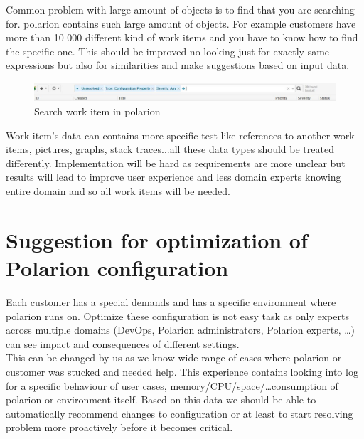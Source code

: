 \documentclass[thesis=M,english]{FITthesis}[2012/06/26]
\begin{document}
Common problem with large amount of objects is to find that you are searching for. \acrshort{polarion} contains such large amount of objects. For example customers have more than 10 000 different kind of work items and you have to know how to find the specific one. This should be improved no looking just for exactly same expressions but also for similarities and make suggestions based on input data. 

\begin{figure}[h!]\centering
	\includegraphics[width=1\textwidth]{pictures/polarion_search}
	\caption{Search work item in \acrshort{polarion}}\label{fig:polarion_search}
\end{figure}

Work item's data can contains more specific test like references to another work items, pictures, graphs, stack traces...all these data types should be treated differently. Implementation will be hard as requirements are more unclear but results will lead to improve user experience and less domain experts knowing entire domain and so all work items will be needed.

\section{Suggestion for optimization of Polarion configuration} 

Each customer has a special demands and has a specific environment where \acrshort{polarion} runs on. Optimize these configuration is not easy task as only experts across multiple domains (DevOps, Polarion administrators, Polarion experts, \dots) can see impact and consequences of different settings. \\

This can be changed by us as we know wide range of cases where \acrfull{polarion} or customer was stucked and needed help. This experience contains looking into log for a specific behaviour of user cases, memory/CPU/space/\dots consumption of \acrshort{polarion} or environment itself. Based on this data we should be able to automatically recommend changes to configuration or at least to start resolving problem more proactively before it becomes critical.\\
\end{document}

